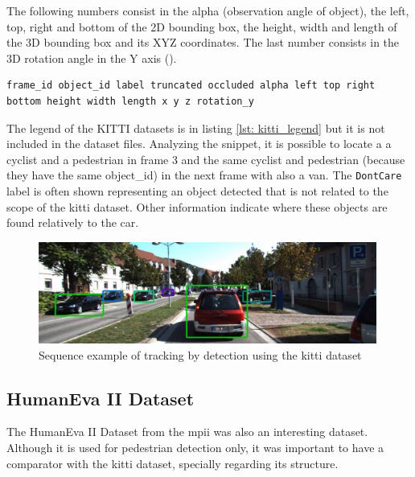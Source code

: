 The following numbers consist in the alpha (observation angle of object), the left, top, right and bottom of the 2D bounding box, the height, width and length of the 3D bounding box and its XYZ coordinates. The last number consists in the 3D rotation angle in the Y axis (\cite{Team}).

\begin{center}
	\begin{lstlisting}[caption={KITTI dataset file snippet legend.}, label={lst: kitti_legend}]
	frame_id object_id label truncated occluded alpha left top right bottom height width length x y z rotation_y	\end{lstlisting}
\end{center}

The legend of the KITTI datasets is in listing \ref{lst: kitti_legend} but it is not included in the dataset files. Analyzing the snippet, it is possible to locate a a cyclist and a pedestrian in frame 3 and the same cyclist and pedestrian (because they have the same object\_id) in the next frame with also a van. The \texttt{DontCare} label is often shown representing an object detected that is not related to the scope of the \gls{kitti} dataset. Other information indicate where these objects are found relatively to the car.

\begin{figure}[htp]
	
	\centering
	\includegraphics[width=0.99\textwidth]{capstate/imgs/kittiresult}
	
	\caption{Sequence example of tracking by detection using the \gls{kitti} dataset}
	\label{fig:kittiresult}
	
\end{figure}
	
\subsection{HumanEva II Dataset}
The HumanEva II Dataset from the \gls{mpii} was also an interesting dataset. Although it is used for pedestrian detection only, it was important to have a comparator with the \gls{kitti} dataset, specially regarding its structure. 

